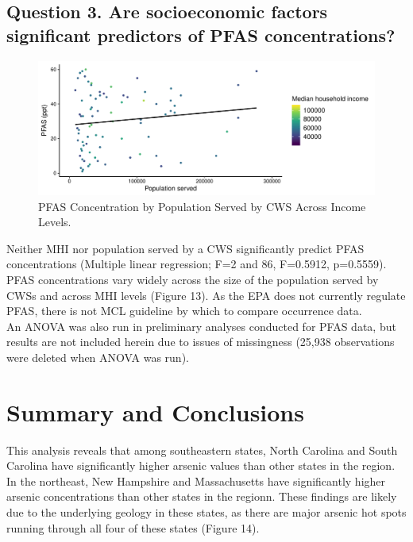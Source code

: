 \documentclass[12pt,]{article}
\begin{document}
\newpage

\hypertarget{question-3.-are-socioeconomic-factors-significant-predictors-of-pfas-concentrations}{%
\subsection{Question 3. Are socioeconomic factors significant predictors
of PFAS
concentrations?}\label{question-3.-are-socioeconomic-factors-significant-predictors-of-pfas-concentrations}}

\begin{figure}
\centering
\includegraphics{Project_Template_files/figure-latex/figs13-1.pdf}
\caption{PFAS Concentration by Population Served by CWS Across Income
Levels.}
\end{figure}

Neither MHI nor population served by a CWS significantly predict PFAS
concentrations (Multiple linear regression; F=2 and 86, F=0.5912,
p=0.5559). PFAS concentrations vary widely across the size of the
population served by CWSs and across MHI levels (Figure 13). As the EPA
does not currently regulate PFAS, there is not MCL guideline by which to
compare occurrence data.\\
An ANOVA was also run in preliminary analyses conducted for PFAS data,
but results are not included herein due to issues of missingness (25,938
observations were deleted when ANOVA was run).

\newpage

\hypertarget{summary-and-conclusions}{%
\section{Summary and Conclusions}\label{summary-and-conclusions}}

This analysis reveals that among southeastern states, North Carolina and
South Carolina have significantly higher arsenic values than other
states in the region. In the northeast, New Hampshire and Massachusetts
have significantly higher arsenic concentrations than other states in
the regionn. These findings are likely due to the underlying geology in
these states, as there are major arsenic hot spots running through all
four of these states (Figure 14).
\end{document}
